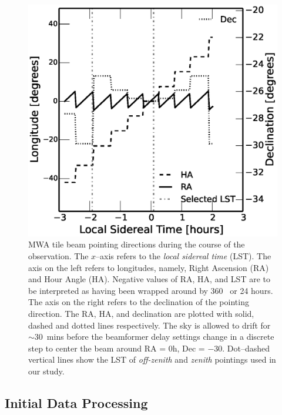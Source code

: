 \documentclass[preprint2,iop,numberedappendix]{emulateapj}
\begin{document}
\begin{figure}[htb]
\centering
\includegraphics[width=\linewidth]{figures/v1_0/custom_pointings.eps}
\caption{MWA tile beam pointing directions during the course of the observation. The $x$--axis refers to the {\it local sidereal time} (LST). The axis on the left refers to longitudes, namely, Right Ascension (RA) and Hour Angle (HA). Negative values of RA, HA, and LST are to be interpreted as having been wrapped around by 360\arcdeg~ or 24 hours. The axis on the right refers to the declination of the pointing direction. The RA, HA, and declination are plotted with solid, dashed and dotted lines respectively. The sky is allowed to drift for $\sim 30$~mins before the beamformer delay settings change in a discrete step to center the beam around RA = 0h, Dec = $-30$\arcdeg. Dot--dashed vertical lines show the LST of {\it off-zenith} and {\it zenith} pointings used in our study. \label{fig:pointings}}
\end{figure}

\subsection{Initial Data Processing}\label{sec:data-analysis}
\end{document}
